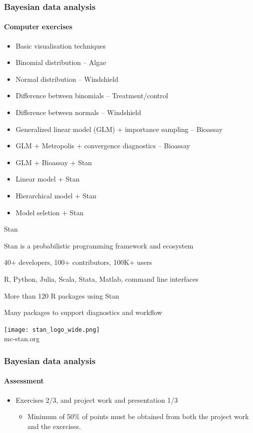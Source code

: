 \documentclass[english]{beamer}
\begin{document}
\begin{frame}
  \frametitle{Bayesian data analysis}  %
  \framesubtitle{Computer exercises}
  \begin{itemize}
  \item Basic visualisation techniques
  \item Binomial distribution -- Algae
  \item Normal distribution -- Windshield
  \item Difference between binomials -- Treatment/control
  \item Difference between normals -- Windshield
  \item Generalized linear model (GLM) + importance sampling -- Bioassay
  \item GLM + Metropolis + convergence diagnostics -- Bioassay
  \item GLM + Bioassay + Stan
  \item Linear model + Stan
  \item Hierarchical model + Stan
  \item Model seletion + Stan
  \end{itemize}

\end{frame}

\begin{frame}{Stan}
  
  Stan is a probabilistic programming framework and ecosystem

  40+ developers, 100+ contributors, 100K+ users

  R, Python, Julia, Scala, Stata, Matlab, command line interfaces
  
  More than 120 R packages using Stan

  Many packages to support diagnostics and workflow
  
  \center
  \vspace{\baselineskip}
  \texttt{[image: stan\_logo\_wide.png]}\\
  mc-stan.org

\end{frame}

\begin{frame}
  \frametitle{Bayesian data analysis}  %
  \framesubtitle{Assessment}
  \begin{itemize}
  \item Exercises 2/3, and project work and presentation 1/3
     \begin{itemize}
     \item Minimum of 50\% of points must be obtained from both the project work and the exercises.
     \end{itemize}
  \end{itemize}

\end{frame}
\end{document}
